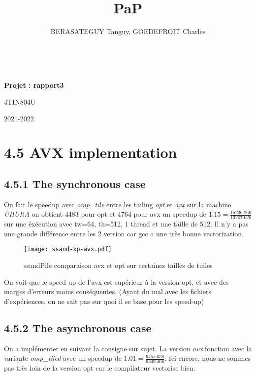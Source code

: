 \documentclass[10pt, a4paper]{article}
\title{PaP}
\author{BERASATEGUY Tanguy, GOEDEFROIT Charles}
\begin{document}
\begin{titlepage}
  \centering
  \ {} %
  \vfill
  \vspace{1cm}
  {\scshape\LARGE\MyTitle\par}
  \vspace{0.5cm}
  {\huge\bfseries Projet : rapport3\par}
  \vspace{0.5cm}
  {\Large 4TIN804U\par}
  \vspace{1cm}
  \MyAuthor
  \vfill
  {\large2021-2022\par}
\end{titlepage}

\newpage

\tableofcontents

\newpage

\section{4.5 AVX implementation}

\subsection{4.5.1 The synchronous case}

On fait le speedup avec \emph{omp\_tile} entre les tailing \emph{opt} et \emph{avx} sur la machine
\emph{UHURA} on obtient 4483 pour opt et 4764 pour avx un speedup de $1.15 =\frac{15236.266}{13207.626}$
sur une éxécution avec tw=64, th=512, 1 thread et une taille de 512.
Il n'y a pas une grande différence entre les 2 version car gcc a une très bonne vectorization.

\begin{figure}[H]
  \centering
  \texttt{[image: ssand-xp-avx.pdf]}
  \caption{\small{ssandPile comparaison avx et opt sur certaines tailles de tuiles}}
\end{figure}

On voit que le speed-up de l'avx est supérieur à la version opt, et avec des marges d'erreurs
moins conséquentes.
(Ayant du mal avec les fichiers d'expériences, on ne sait pas sur quoi il se base pour les speed-up)

\subsection{4.5.2 The asynchronous case}

On a implémenter en suivant la consigne sur sujet.
La version \emph{avx} fonction avec la variante \emph{omp\_tiled} avec un speedup de $1.01 =\frac{9455.038}{9349.466}$:
Ici encore, nous ne sommes pas très loin de la version opt car le compilateur vectorise bien.
\end{document}
